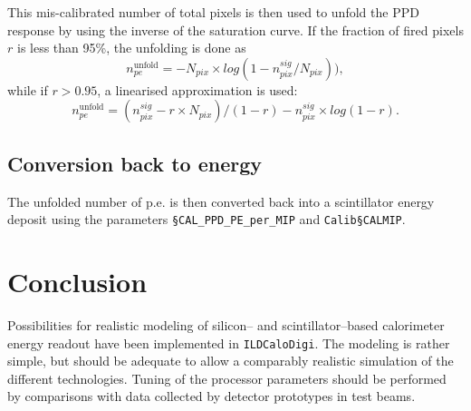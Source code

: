 \documentclass[12pt]{article} %
\begin{document}
This mis-calibrated number of total pixels is then used to 
unfold the PPD response by using the inverse of the saturation curve.
If the fraction of fired pixels $r$ is less than 95\%, the unfolding is done as
\begin{equation*}
n_{pe}^\text{unfold} = - N_{pix} \times log ( 1 - n_{pix}^{sig} / N_{pix} ) ),
\end{equation*}
while if $r > 0.95$,  a linearised approximation is used:
\begin{equation*}
n_{pe}^\text{unfold} =  
(n_{pix}^{sig} - r \times N_{pix})/(1-r) - n_{pix}^{sig} \times log ( 1 - r ).
\end{equation*}




\subsection*{Conversion back to energy}
The unfolded number of p.e. is then converted back into a scintillator energy deposit using the parameters
{\tt \S CAL\_PPD\_PE\_per\_MIP}
and 
{\tt Calib\S CALMIP}.

\section{Conclusion}
Possibilities for realistic modeling of silicon-- and scintillator--based calorimeter  energy readout have been
implemented in {\tt ILDCaloDigi}. The modeling is rather simple, but should be adequate to allow 
a comparably realistic simulation of the different technologies. 
Tuning of the processor parameters
should be performed by comparisons with data collected by detector prototypes in test beams.
\end{document}
